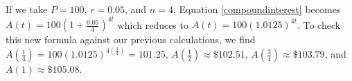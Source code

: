 \smallskip


\smallskip

If we take $P = 100$, $r = 0.05$, and $n = 4$, Equation \ref{compoundinterest} becomes $A(t) = 100\left(1+ \frac{0.05}{4}\right)^{4t}$ which reduces to $A(t) = 100(1.0125)^{4t}$.  To check this new formula against our previous calculations, we find $A\left(\frac{1}{4}\right) = 100(1.0125)^{4 \left(\frac{1}{4}\right)} = 101.25$, $A\left(\frac{1}{2}\right) \approx \$102.51$, $A\left(\frac{3}{4}\right) \approx \$103.79$, and $A(1) \approx \$105.08$.

\medskip

